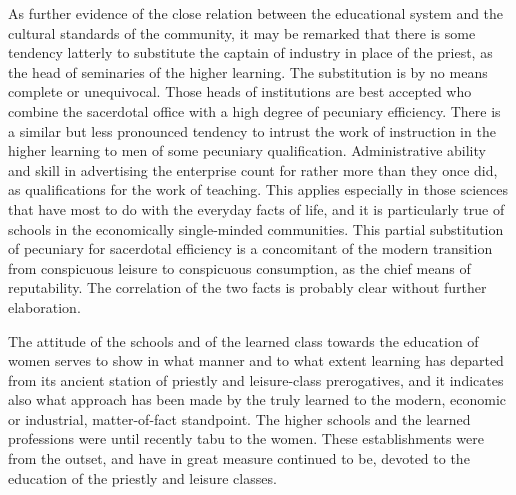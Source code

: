 \documentclass[12pt]{report}
\begin{document}
As further evidence of the close relation between the educational system
and the cultural standards of the community, it may be remarked that
there is some tendency latterly to substitute the captain of industry in
place of the priest, as the head of seminaries of the higher learning.
The substitution is by no means complete or unequivocal. Those heads of
institutions are best accepted who combine the sacerdotal office with
a high degree of pecuniary efficiency. There is a similar but less
pronounced tendency to intrust the work of instruction in the higher
learning to men of some pecuniary qualification. Administrative ability
and skill in advertising the enterprise count for rather more than
they once did, as qualifications for the work of teaching. This applies
especially in those sciences that have most to do with the everyday
facts of life, and it is particularly true of schools in the
economically single-minded communities. This partial substitution of
pecuniary for sacerdotal efficiency is a concomitant of the modern
transition from conspicuous leisure to conspicuous consumption, as
the chief means of reputability. The correlation of the two facts is
probably clear without further elaboration.

The attitude of the schools and of the learned class towards the
education of women serves to show in what manner and to what extent
learning has departed from its ancient station of priestly and
leisure-class prerogatives, and it indicates also what approach has
been made by the truly learned to the modern, economic or industrial,
matter-of-fact standpoint. The higher schools and the learned
professions were until recently tabu to the women. These establishments
were from the outset, and have in great measure continued to be, devoted
to the education of the priestly and leisure classes.
\end{document}
